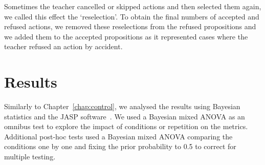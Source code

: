 Sometimes the teacher cancelled or skipped actions and then selected them again, we called this effect the `reselection'. To obtain the final numbers of accepted and refused actions, we removed these reselections from the refused propositions and we added them to the accepted propositions as it represented cases where the teacher refused an action by accident.

\section{Results}

Similarly to Chapter~\ref{chap:control}, we analysed the results using Bayesian statistics and the JASP software~\citep{jasp2018}. We used a Bayesian mixed ANOVA as an omnibus test to explore the impact of conditions or repetition on the metrics. Additional post-hoc tests used a Bayesian mixed ANOVA comparing the conditions one by one and fixing the prior probability to 0.5  to correct for multiple testing.
